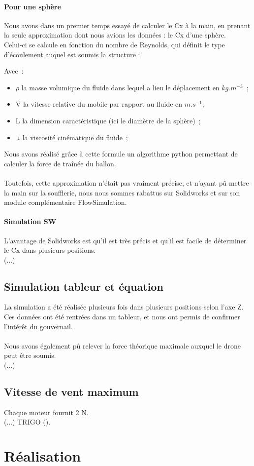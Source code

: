 \documentclass[a4paper,11pt]{article}
\begin{document}
\paragraph{Pour une sphère}
	Nous avons dans un premier temps essayé de calculer le Cx à la main, en prenant la seule approximation dont nous avions les données : le Cx d'une sphère.\\
	Celui-ci se calcule en fonction du nombre de Reynolds, qui définit le type d'écoulement auquel est soumis la structure :
	\begin{center}
  \end{center}
	Avec~:
  \begin{itemize}
	 \item $\rho$ la masse volumique du fluide dans lequel a lieu le déplacement en $kg.m^{-3}$~;
   \item V la vitesse relative du mobile par rapport au fluide en $m.s^{-1}$;
   \item L la dimension caractéristique (ici le diamètre de la sphère)~;
   \item $\micro$ la viscosité cinématique du fluide~;
  \end{itemize}
	Nous avons réalisé grâce à cette formule un algorithme python permettant de calculer la force de traînée du ballon.\\
	\\
	Toutefois, cette approximation n'était pas vraiment précise, et n'ayant pû mettre la main sur la soufflerie, nous nous sommes rabattus sur Solidworks et sur son module complémentaire FlowSimulation.
\paragraph{Simulation SW}
	L'avantage de Solidworks est qu'il est très précis et qu'il est facile de déterminer le Cx dans plusieurs positions.\\
	(...)
\subsection{Simulation tableur et équation}
	La simulation a été réalisée plusieurs fois dans plusieurs positions selon l'axe Z.\\
	Ces données ont été rentrées dans un tableur, et nous ont permis de confirmer l'intérêt du gouvernail.\\
	\\
	Nous avons également pû relever la force théorique maximale auxquel le drone peut être soumis.\\
	(...)
\subsection{Vitesse de vent maximum}
	Chaque moteur fournit 2 N.\\
	(...) TRIGO ().
\section{Réalisation}
\end{document}
